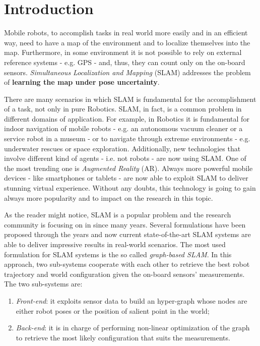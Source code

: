 \chapter{Introduction}\label{ch:intro}
Mobile robots, to accomplish tasks in real world more easily and in an efficient way, need to have a map of the environment and to localize themselves into the map. Furthermore, in some environment it is not possible to rely on external reference systems - e.g. GPS - and, thus, they can count only on the on-board sensors. \textit{Simultaneous Localization and Mapping} (SLAM) addresses the problem of \textbf{learning the map under pose uncertainty}.

There are many scenarios in which SLAM is fundamental for the accomplishment of a task, not only in pure Robotics. SLAM, in fact, is a common problem in different domains of application. For example, in Robotics it is fundamental for indoor navigation of mobile robots - e.g. an autonomous vacuum cleaner or a service robot in a museum - or to navigate through extreme environments - e.g. underwater rescues or space exploration. Additionally, new technologies that involve different kind of agents - i.e. not robots - are now using SLAM. One of the most trending one is \textit{Augmented Reality} (AR). Always more powerful mobile devices - like smartphones or tablets - are now able to exploit SLAM to deliver stunning virtual experience. Without any doubts, this technology is going to gain always more popularity and to impact on the research in this topic.

As the reader might notice, SLAM is a popular problem and the research community is focusing on in since many years. Several formulations have been proposed through the years and now current state-of-the-art SLAM systems are able to deliver impressive results in real-world scenarios. The most used formulation for SLAM systems is the so called \textit{graph-based SLAM}. In this approach, two sub-systems cooperate with each other to retrieve the best robot trajectory and world configuration given the on-board sensors' measurements. The two sub-systems are:

\begin{enumerate}
    \item \textit{Front-end}: it exploits sensor data to build an hyper-graph whose nodes are either robot poses or the position of salient point in the world;
    \item \textit{Back-end}: it is in charge of performing non-linear optimization of the graph to retrieve the most likely configuration that suits the measurements.
\end{enumerate}

